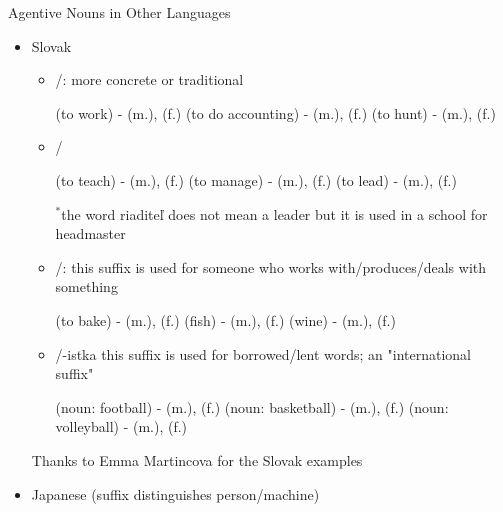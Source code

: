 \begin{frame}[allowframebreaks]{Agentive Nouns in Other Languages}

  

\begin{itemize}
\item Slovak 
  \begin{itemize}
  \item {}/: more concrete or traditional
      \begin{exe}
        \ex {} (to work) -  (m.),  (f.)
        \ex {} (to do accounting) -  (m.),  (f.)
        \ex {} (to hunt) -  (m.),  (f.)
      \end{exe}
    \item {}/
      \begin{exe}
        \ex {} (to teach) -  (m.),  (f.)
        \ex {} (to manage) -  (m.),   (f.)
        \ex {} (to lead) -  (m.),  (f.)
      \end{exe}
      $^*$the word riaditeľ does not mean a leader but it is used in a school for headmaster 
    \item  {}/: this suffix is used for someone who works with/produces/deals with something
      \begin{exe}
        \ex {} (to bake) -  (m.),  (f.)
        \ex {} (fish) -  (m.),  (f.)
        \ex {} (wine) -  (m.),  (f.)
      \end{exe}
    \item {}/{-istka} this suffix is used for borrowed/lent words; an "international suffix"
      \begin{exe}
        \ex {} (noun: football) -  (m.),  (f.)
        \ex {} (noun: basketball) -  (m.),  (f.)
        \ex {} (noun: volleyball) -  (m.),  (f.)
      \end{exe}
  \end{itemize}
  Thanks to Emma Martincova for the Slovak examples
  \framebreak
\item Japanese (suffix distinguishes person/machine)
  

\end{itemize}
\end{frame}

